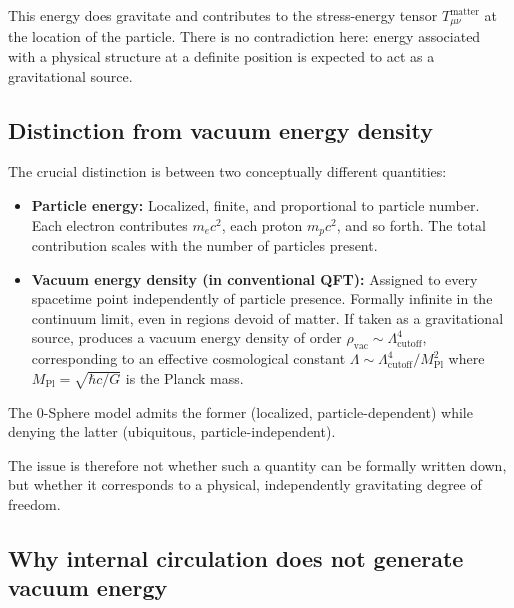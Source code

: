 \documentclass[12pt,letterpaper]{article}
\begin{document}
This energy does gravitate and contributes to the stress-energy tensor $T_{\mu\nu}^{\mathrm{matter}}$ at the location of the particle. There is no contradiction here: energy associated with a physical structure at a definite position is expected to act as a gravitational source.

\subsection{Distinction from vacuum energy density}

The crucial distinction is between two conceptually different quantities:

\begin{itemize}
\item \textbf{Particle energy:} Localized, finite, and proportional to particle number. Each electron contributes $m_e c^2$, each proton $m_p c^2$, and so forth. The total contribution scales with the number of particles present.

\item \textbf{Vacuum energy density (in conventional QFT):} Assigned to every spacetime point independently of particle presence. Formally infinite in the continuum limit, even in regions devoid of matter. If taken as a gravitational source, produces a vacuum energy density of order $\rho_{\mathrm{vac}} \sim \Lambda_{\mathrm{cutoff}}^4$, corresponding to an effective cosmological constant $\Lambda \sim \Lambda_{\mathrm{cutoff}}^4/M_{\mathrm{Pl}}^2$ where $M_{\mathrm{Pl}} = \sqrt{\hbar c/G}$ is the Planck mass.
\end{itemize}

The 0-Sphere model admits the former (localized, particle-dependent) while denying the latter (ubiquitous, particle-independent).

The issue is therefore not whether such a quantity can be formally written down, but whether it corresponds to a physical, independently gravitating degree of freedom.

\subsection{Why internal circulation does not generate vacuum energy}
\end{document}
